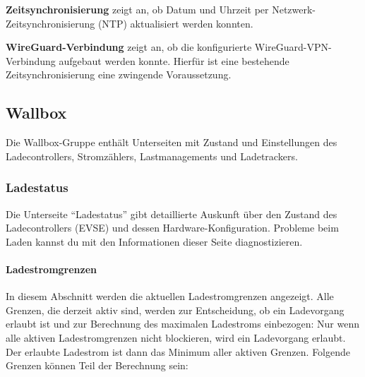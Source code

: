 \documentclass[a4paper,10pt]{article}
\begin{document}
\begin{multicols*}{2}
    \textbf{Zeitsynchronisierung} zeigt an, ob Datum und Uhrzeit per Netzwerk-Zeitsynchronisierung (NTP) aktualisiert werden konnten.

    \textbf{WireGuard-Verbindung} zeigt an, ob die konfigurierte WireGuard-VPN-Verbindung aufgebaut werden konnte. Hierfür ist eine bestehende Zeitsynchronisierung eine zwingende Voraussetzung.



    \vfill
    \null

    \columnbreak

    \subsection{Wallbox}
    Die Wallbox-Gruppe enthält Unterseiten mit Zustand und Einstellungen des Ladecontrollers, Stromzählers, Lastmanagements und Ladetrackers.

    \subsubsection{Ladestatus}\label{evse}
    Die Unterseite \enquote{Ladestatus} gibt detaillierte Auskunft über den Zustand
    des Ladecontrollers (EVSE) und dessen Hardware-Konfiguration. Probleme beim Laden
    kannst du mit den Informationen dieser Seite diagnostizieren.

    \paragraph{Ladestromgrenzen}
    In diesem Abschnitt werden die aktuellen Ladestromgrenzen angezeigt. Alle Grenzen, die
    derzeit aktiv sind, werden zur Entscheidung, ob ein Ladevorgang erlaubt ist und zur Berechnung des maximalen Ladestroms einbezogen:
    Nur wenn alle aktiven Ladestromgrenzen nicht blockieren, wird ein Ladevorgang erlaubt.
    Der erlaubte Ladestrom ist dann das Minimum aller aktiven Grenzen. Folgende Grenzen können Teil der Berechnung sein:


\end{multicols*}
\end{document}
